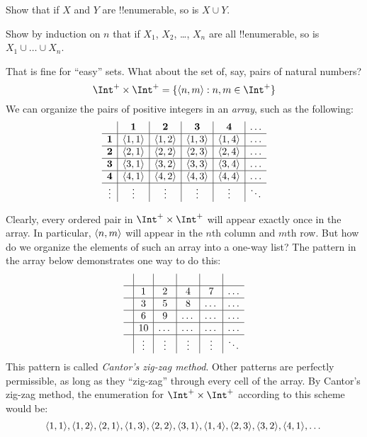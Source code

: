\documentclass[../../../include/open-logic-section]{subfiles}
\begin{document}
\begin{prob}
  Show that if $X$ and $Y$ are !!{enumerable}, so is $X \cup Y$.
\end{prob}

\begin{prob}
  Show by induction on $n$ that if $X_1$, $X_2$, \dots, $X_n$ are all
  !!{enumerable}, so is $X_1 \cup \dots \cup X_n$.
\end{prob}

\begin{explain}
That is fine for ``easy'' sets. What about the set of, say, pairs of
natural numbers?{}
\[
\Int^+ \times \Int^+ = \Setabs{\tuple{n,m}}{n,m \in \Int^+}
\]
We can organize the pairs of positive integers 
in an \emph{array}, such as the following:
\[
\begin{array}{ c | c | c | c | c | c}
& \textbf 1 & \textbf 2 & \textbf 3 & \textbf 4 & \dots \\
\hline
\textbf 1 & \tuple{1,1} & \tuple{1,2} & \tuple{1,3} & \tuple{1,4} & \dots \\
\hline
\textbf 2 & \tuple{2,1} & \tuple{2,2} & \tuple{2,3} & \tuple{2,4} & \dots \\
\hline
\textbf 3 & \tuple{3,1} & \tuple{3,2} & \tuple{3,3} & \tuple{3,4} & \dots \\
\hline
\textbf 4 & \tuple{4,1} & \tuple{4,2} & \tuple{4,3} & \tuple{4,4} & \dots \\
\hline
\vdots & \vdots & \vdots & \vdots & \vdots & \ddots\\
\end{array}
\]

Clearly, every ordered pair in $\Int^+ \times \Int^+$ will appear
exactly once in the array. In particular, $\langle n,m \rangle$ will appear in
the $n$th column and $m$th row. But how do we organize the elements of
such an array into a one-way list? The pattern in the array below
demonstrates one way to do this:
\[
\begin{array}{ c | c | c | c | c | c }
& & & & & \\
\hline
& 1 & 2 & 4 & 7 & \dots \\
\hline
& 3 & 5 & 8 & \dots & \dots \\
\hline
& 6 & 9 & \dots & \dots & \dots \\
\hline
& 10 & \dots & \dots & \dots & \dots \\
\hline
& \vdots & \vdots & \vdots & \vdots & \ddots\\
\end{array}
\]
This pattern is called \emph{Cantor's zig-zag method}. Other patterns
are perfectly permissible, as long as they ``zig-zag'' through every
cell of the array. By Cantor's zig-zag method, the enumeration for
$\Int^+ \times \Int^+$ according to this scheme would be:
\[
\langle 1,1 \rangle, \langle 1,2 \rangle, \langle 2,1 \rangle, \langle 1,3 \rangle, \langle 2,2 \rangle,
\langle 3,1 \rangle, \langle 1,4 \rangle, \langle 2,3 \rangle, \langle 3,2 \rangle, \langle 4,1 \rangle, \dots
\]


\end{explain}
\end{document}
